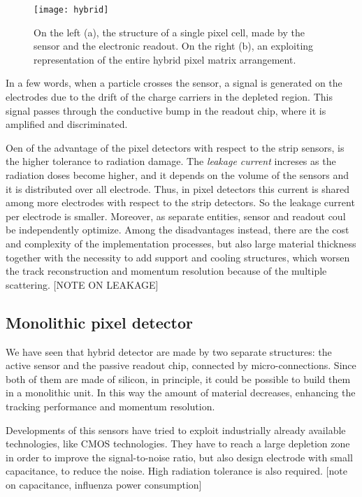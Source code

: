 \begin{figure}[h!]
\centering
\texttt{[image: hybrid]}
\caption{On the left (a), the structure of a single pixel cell, made by the sensor and the electronic readout. On the right (b), an exploiting representation of the entire hybrid pixel matrix arrangement.}
\label{fig:hybrid}
\end{figure}

In a few words, when a particle crosses the sensor, a signal is generated on the electrodes due to the drift of the charge carriers in the depleted region. This signal passes through the conductive bump in the readout chip, where it is amplified and discriminated.

Oen of the advantage of the pixel detectors with respect to the strip sensors, is the higher tolerance to radiation damage. The \emph{leakage current} increses as the radiation doses become higher, and it depends on the volume of the sensors and it is distributed over all electrode. Thus, in pixel detectors this current is shared among more electrodes with respect to the strip detectors. So the leakage current per electrode is smaller. Moreover, as separate entities, sensor and readout coul be independently optimize.
Among the disadvantages instead, there are the cost and complexity of the implementation processes, but also large material thickness together with the necessity to add support and cooling structures, which worsen the track reconstruction and momentum resolution because of the multiple scattering.
[NOTE ON LEAKAGE]

\subsection{Monolithic pixel detector}

We have seen that hybrid detector are made by two separate structures: the active sensor and the passive readout chip, connected by micro-connections. Since both of them are made of silicon, in principle, it could be possible to build them in a monolithic unit. In this way the amount of material decreases, enhancing the tracking performance and momentum resolution. 

Developments of this sensors have tried to exploit industrially already available technologies, like CMOS technologies. They have to reach a large depletion zone in order to improve the signal-to-noise ratio, but also design electrode with small capacitance, to reduce the noise. High radiation tolerance is also required.
[note on capacitance, influenza power consumption]


